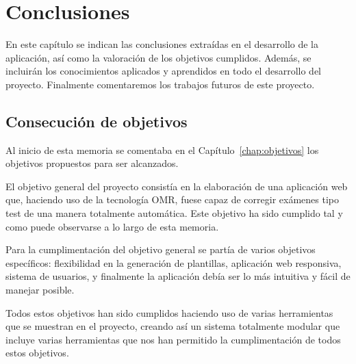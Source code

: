 \documentclass[a4paper, 12pt]{book}
\begin{document}

\cleardoublepage
\chapter{Conclusiones}
\label{chap:conclusiones}

En este capítulo se indican las conclusiones extraídas en el desarrollo
de la aplicación, así como la valoración de los objetivos cumplidos.
Además, se incluirán los conocimientos aplicados y aprendidos en todo
el desarrollo del proyecto.
Finalmente comentaremos los trabajos futuros de este proyecto.

\section{Consecución de objetivos}
\label{sec:consecucion-objetivos}

Al inicio de esta memoria se comentaba en el
Capítulo~\ref{chap:objetivos} los objetivos
propuestos para ser alcanzados.

El objetivo general del proyecto
consistía en la elaboración de una aplicación web que, haciendo uso
de la tecnología OMR, fuese capaz de corregir exámenes tipo test
de una manera totalmente automática. Este objetivo ha sido cumplido
tal y como puede observarse a lo largo de esta memoria.

Para la cumplimentación del objetivo general se partía de varios
objetivos específicos: flexibilidad en la generación de plantillas,
aplicación web responsiva, sistema de usuarios, y finalmente la
aplicación debía ser lo más intuitiva y fácil de manejar posible.

Todos estos objetivos han sido cumplidos haciendo uso de varias
herramientas que se muestran en el proyecto, creando así un sistema
totalmente modular que incluye varias herramientas que nos han
permitido la cumplimentación de todos estos objetivos.

\end{document}

